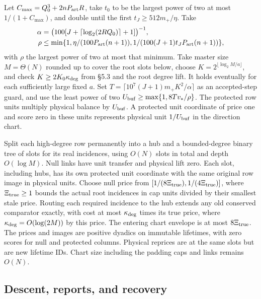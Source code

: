 \documentclass[11pt]{article}
\begin{document}
Let \(C_{\max}=Q_0^3+2nP_{\rm art}R\), take \(t_0\) to be the largest power of two at most \(1/(1+C_{\max})\), and double until the first \(t_J\ge512m_+/\eta\). Take
\[
\begin{split}
 \alpha&=\big(100[J+\lceil\log_2(2RQ_0)\rceil+1]\big)^{-1},\\
 \rho&\le\min\{1,\eta/(100P_{\rm art}(n+1)),1/(100(J+1)t_JP_{\rm art}(n+1))\},
\end{split}
\]
with \(\rho\) the largest power of two at most that minimum. Take master size \(M=\Theta(N)\) rounded up to cover the root slots below, choose \(K=2^{\lfloor\log_2 M/a\rfloor}\), and check \(K\ge 2K_0\kappa_{\rm deg}\) from §5.3 and the root degree lift. It holds eventually for each sufficiently large fixed \(a\). Set \(T=\lceil 10^7(J+1)m_+K^2/\alpha\rceil\) as an accepted-step guard, and use the least power of two \(U_{\rm buf}\ge\max\{1,8T v_\ast/\rho\}\). The protected row units multiply physical balance by \(U_{\rm buf}\). A protected unit coordinate of price one and score zero in these units represents physical unit \(1/U_{\rm buf}\) in the direction chart.

Split each high-degree row permanently into a hub and a bounded-degree binary tree of slots for its real incidences, using \(O(N)\) slots in total and depth \(O(\log M)\). Null links have unit transfer and physical lift zero. Each slot, including hubs, has its own protected unit coordinate with the same original row image in physical units. Choose null price from \([1/(8\Xi_{\rm true}),1/(4\Xi_{\rm true})]\), where \(\Xi_{\rm true}\ge1\) bounds the actual root incidences in cap units divided by their smallest stale price. Routing each required incidence to the hub extends any old conserved comparator exactly, with cost at most \(\kappa_{\rm deg}\) times its true price, where \(\kappa_{\rm deg}=O(\log(2M))\) by this price. The entering chart envelope is at most \(8\Xi_{\rm true}\). The prices and images are positive dyadics on immutable lifetimes, with zero scores for null and protected columns. Physical reprices are at the same slots but are new lifetime IDs. Chart size including the padding caps and links remains \(O(N)\).

\hypertarget{descent-reports-and-recovery}{%
\subsection{Descent, reports, and recovery}\label{descent-reports-and-recovery}}
\end{document}
